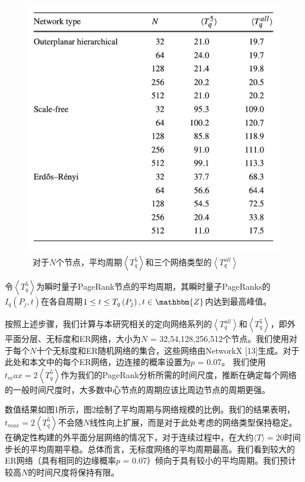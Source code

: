 \begin{figure}[h]
	\centering
	\includegraphics{part/pic/table1.png}
	\caption{\ 对于$N$个节点，平均周期$\left\langle T _ { q } ^ { 5 } \right\rangle$和三个网络类型的$\left\langle T _ { q } ^ { a l l } \right\rangle$}
\end{figure}

令$\left\langle T _ { q } ^ { 5 } \right\rangle$为瞬时量子PageRank节点的平均周期，其瞬时量子PageRanks的$I _ { q } \left( P _ { j } , t \right)$在各自周期$1 \leq t \leq T _ { q } \left( P _ { j } \right) , t \in \mathbbm { Z }$内达到最高峰值。

按照上述步骤，我们计算与本研究相关的定向网络系列的$\left\langle T _ { q } ^ { a l l } \right\rangle$和$\left\langle T _ { q } ^ { 5 } \right\rangle$，即外平面分层、无标度和ER网络，大小为$N$ = 32,54,128,256,512个节点。我们使用对于每个$N$十个无标度和ER随机网络的集合，这些网络由NetworkX [13]生成。对于此处和本文中的每个ER网络，边连接的概率设置为$p$ = 0.07。 我们使用$t_max = 2 \left\langle T _ { q } ^ { 5 } \right\rangle$作为我们的PageRank分析所需的时间尺度，推断在确定每个网络的一般时间尺度时，大多数中心节点的周期应该比周边节点的周期更强。

数值结果如图1所示，图2绘制了平均周期与网络规模的比例。我们的结果表明，$t_{max} = 2 \left\langle T _ { q } ^ { 5 } \right\rangle$不会随$N$线性向上扩展，而是对于此处考虑的网络类型保持稳定。在确定性构建的外平面分层网络的情况下，对于连续过程中，在大约$\langle T \rangle = 20$时间步长的平均周期平稳。总体而言，无标度网络的平均周期最高。我们看到较大的ER网络（具有相同的边缘概率$p$ = 0.07）倾向于具有较小的平均周期。我们预计较高$N$的时间尺度将保持有限。

